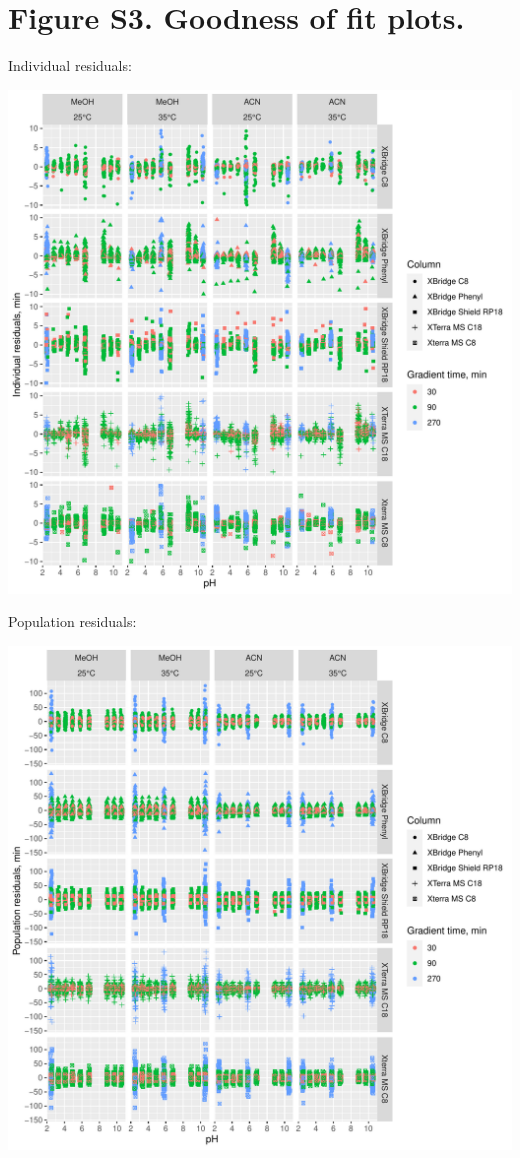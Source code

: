 \documentclass[
]{article}
\begin{document}
\newpage{}

\hypertarget{figure-s3.-goodness-of-fit-plots.}{%
\section{Figure S3. Goodness of fit
plots.}\label{figure-s3.-goodness-of-fit-plots.}}

Individual residuals:

\includegraphics{../figures/concordanceplots/individualresiduals.pdf}

\newpage{}

Population residuals:

\includegraphics{../figures/concordanceplots/populationresiduals.pdf}
\end{document}

